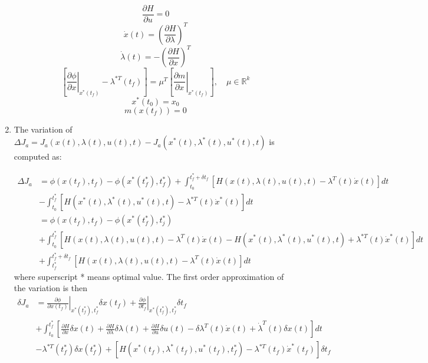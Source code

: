 \documentclass[10pt,a4paper,oneside]{article}
\begin{document}
\begin{enumerate}
\[
\frac{\partial H}{\partial u}=0
\]
\[
\dot{x}(t)=\left(\frac{\partial H}{\partial \lambda}\right)^{T}
\]
\[
\dot{\lambda}(t)=-\left(\frac{\partial H}{\partial x}\right)^{T}
\]
\[
\left[\left.\frac{\partial \phi}{\partial x}\right|_{x^{*}\left(t_{f}\right)}-\lambda^{* T}\left(t_{f}\right)\right]=\mu^{T}\left[\left.\frac{\partial m}{\partial x}\right|_{x^{*}\left(t_{f}\right)}\right], \quad \mu \in \mathbb{R}^{k}
\]
\[
x^{*}\left(t_{0}\right)=x_{0}
\]
\[
m\left(x\left(t_{f}\right)\right)=0
\]
\item The variation of $\Delta J_{a}=J_{a}(x(t), \lambda(t), u(t), t)-J_{a}\left(x^{*}(t), \lambda^{*}(t), u^{*}(t), t\right)$ is computed as:

\begin{align*}
\Delta J_{a}&=\phi\left(x\left(t_{f}\right), t_{f}\right)-\phi\left(x^{*}\left(t_{f}^{*}\right), t_{f}^{*}\right)
+ \int_{t_{0}}^{t_{f}^{*}+\delta t_{f}}\left[H(x(t), \lambda(t), u(t), t)-\lambda^{T}(t) \dot{x}(t)\right] d t\\ &-\int_{t_{0}}^{t_{f}^{*}}\left[H\left(x^{*}(t), \lambda^{*}(t), u^{*}(t), t\right)-\lambda^{* T}(t) \dot{x}^{*}(t)\right] d t\\&=\phi\left(x\left(t_{f}\right), t_{f}\right)-\phi\left(x^{*}\left(t_{f}^*\right), t_{j}^{*}\right)\\&+\int_{t_{0}}^{t_{f}^*}\left[H(x(t), \lambda(t), u(t), t)-\lambda^{T}(t) \dot{x}(t)-H\left(x^{*}(t), \lambda^{*}(t), u^{*}(t), t\right)+{\lambda^{*T}}(t) \dot{x}^*(t)\right] d t
\\&+\int_{t_{f}^*}^{t_{f}^{*}+\delta t_{f}}\left[H(x(t), \lambda(t), u(t), t)-\lambda^{T}(t) \dot{x}(t)\right]dt
\end{align*}
where superscript * means optimal value. The first order approximation of the variation is then
\begin{align*}
\delta J_{a}&=\left.\frac{\partial \phi}{\partial x\left(t_{f}\right)}\right|_{x^{*}\left(t_{f}^*\right), t_{f}^{*}} \delta x\left(t_{f}\right)+\left.\frac{\partial \phi}{\partial t_{f}}\right|_{x^{*}\left(t_{f}^*\right), t_{f}^*} \delta t_{f}\\&+\int_{t_{0}}^{t_{f}^*}\left[\frac{\partial H}{\partial x} \delta x(t)+\frac{\partial H}{\partial \lambda} \delta \lambda(t)+\frac{\partial H}{\partial u} \delta u(t)-\delta \lambda^{T}(t) \dot{x}(t)+\dot{\lambda}^{T}(t) \delta x(t)\right] dt\\&-\lambda^{* T}\left(t_{f}^{*}\right) \delta x\left(t_{f}^{*}\right)+\left[H\left(x^{*}\left(t_{f}\right), \lambda^{*}\left(t_{f}\right), u^{*}\left(t_{f}\right), t_{f}^{*}\right)-\lambda^{* T}\left(t_{f}\right) \dot{x}^{*}\left(t_{f}\right)\right] \delta t_{f}

\end{align*}
\end{enumerate}
\end{document}
